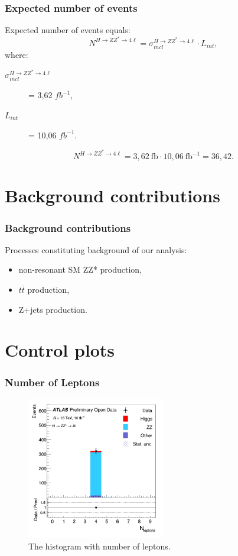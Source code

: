 \documentclass[aspectratio=1610, english]{beamer}
\newcommand{\hzz}{ H\rightarrow ZZ^{*}\rightarrow 4 \ell}
\begin{document}
\begin{frame}
\frametitle{Expected number of events}
Expected number of events equals:
\begin{equation}
N^{ \hzz }=\sigma^{ \hzz }_{incl} \cdot L_{int},
\end{equation}
where:
\begin{description}
\item[$\sigma^{ \hzz }_{incl}$] = 3,62 $fb^{-1}$,
\item[$L_{int}$] = 10,06 $fb^{-1}$.
\end{description}
\vspace{1cm}
\begin{equation}
N^{ \hzz }=3,62 \: \mathrm{fb} \cdot 10,06 \: \mathrm{fb}^{-1} = 36,42.
\end{equation}

\end{frame}

\section{Background contributions}
\begin{frame}
\frametitle{Background contributions}
Processes constituting background of our analysis:
\begin{itemize}
\item non-resonant SM ZZ* production,
\item $t\bar{t}$ production,
\item Z+jets production.
\end{itemize}

\end{frame}

\section{Control plots}

\begin{frame}
\frametitle{Number of Leptons}

\begin{figure} [H]
\centering
\includegraphics[width=6cm]{hist_n_leptons.png}
\caption{The histogram with number of leptons. }
\end{figure}

\end{frame}
\end{document}
